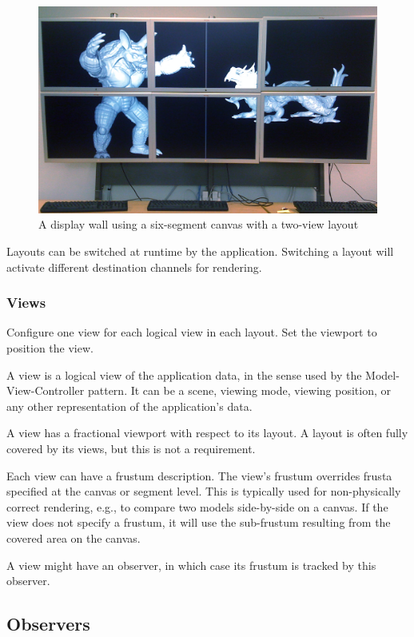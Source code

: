 \documentclass[10pt,a4]{scrartcl}
\begin{document}
\begin{figure}[ht!]\center
  \includegraphics[width=.9\textwidth]{images/wallLayout.jpg}
  {\caption{A display wall using a six-segment canvas with a two-view layout}}
\end{figure}

Layouts can be switched at runtime by the application. Switching a
layout will activate different destination channels for rendering.

\subsubsection{Views}

Configure one \textsf{view} for each logical view in each layout. Set
the \textsf{viewport} to position the view.

A view is a logical view of the application data, in the sense used by
the Model-View-Controller pattern. It can be a scene, viewing mode,
viewing position, or any other representation of the application's data.

A view has a fractional viewport with respect to its layout.  A layout
is often fully covered by its views, but this is not a requirement.

Each view can have a frustum description. The view's frustum overrides
frusta specified at the canvas or segment level. This is typically used
for non-physically correct rendering, e.g., to compare two models
side-by-side on a canvas. If the view does not specify a frustum, it
will use the sub-frustum resulting from the covered area on the canvas.

A view might have an observer, in which case its frustum is tracked by
this observer. 

\subsection{Observers}
\end{document}
